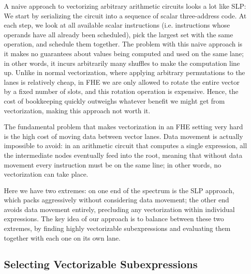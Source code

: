 

A naive approach to vectorizing arbitrary arithmetic circuits looks a lot like SLP: We start by serializing the circuit into a sequence of scalar three-address code.
At each step, we look at all available scalar instructions (i.e. instructions whose operands have all already been scheduled), pick the largest set with the same operation, and schedule them together.
The problem with this naive approach is it makes no guarantees about values being computed and used on the same lane; in other words, it incurs arbitrarily many shuffles to make the computation line up. 
Unlike in normal vectorization, where applying arbitrary permutations to the lanes is relatively cheap, in FHE we are only allowed to rotate the entire vector by a fixed number of slots, and this rotation operation is expensive.
Hence, the cost of bookkeeping quickly outweighs whatever benefit we might get from vectorization, making this approach not worth it.

The fundamental problem that makes vectorization in an FHE setting very hard is the high cost of moving data between vector lanes. 
Data movement is actually impossible to avoid: in an arithmetic circuit that computes a single expression, all the intermediate nodes eventually feed into the root, meaning that without data movement every instruction must be on the same line; in other words, no vectorization can take place.

Here we have two extremes: on one end of the spectrum is the SLP approach, which packs aggressively without considering data movement; the other end avoids data movement entirely, precluding any vectorization within individual expressions.
The key idea of our approach is to balance between these two extremes, by finding highly vectorizable subexpressions and evaluating them together with each one on its own lane.
\subsection{Selecting Vectorizable Subexpressions}  

